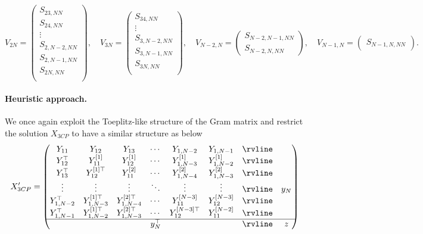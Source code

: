 \begin{appendices}
\begin{equation}
    \label{eq:ch3_QSD-V_2N}
    V_{2N} =
    \begin{pmatrix}
        S_{23,NN} \\
        S_{24,NN} \\
        \vdots \\
        S_{2,N-2,NN} \\
        S_{2,N-1,NN} \\
        S_{2N,NN} \\
    \end{pmatrix},
    \quad
    V_{3N} =
    \begin{pmatrix}
        S_{34,NN} \\
        \vdots \\
        S_{3,N-2,NN} \\
        S_{3,N-1,NN} \\
        S_{3N,NN} \\
    \end{pmatrix},
    \quad
    V_{N-2,N} =
    \begin{pmatrix}
        S_{N-2,N-1,NN} \\
        S_{N-2,N,NN}
    \end{pmatrix},
    \quad
    V_{N-1,N} =
    \begin{pmatrix}
        S_{N-1,N,NN}
    \end{pmatrix}.
\end{equation}

\paragraph{Heuristic approach.}

We once again exploit the Toeplitz-like structure of the Gram matrix and restrict the solution $X_{3CP}$ to have a similar structure as below
\begin{align}
    \label{eq:ch3_QSD-X_3CP}
    X'_{3CP} =
    \begin{pmatrix}
        Y_{11} & Y_{12} & Y_{13} & \cdots & Y_{1,N-2} & Y_{1,N-1} & \rvline & \\
        Y_{12}^\top & Y_{11}^{[1]} & Y_{12}^{[1]} & \cdots & Y_{1,N-3}^{[1]} & Y_{1,N-2}^{[1]} & \rvline & \\
        Y_{13}^\top & Y_{12}^{[1]\top} & Y_{11}^{[2]} & \cdots & Y_{1,N-4}^{[2]} & Y_{1,N-3}^{[2]} & \rvline \\
        \vdots & \vdots & \vdots & \ddots & \vdots & \vdots & \rvline & y_N \\
        Y_{1,N-2}^\top & Y_{1,N-3}^{[1]\top} & Y_{1,N-4}^{[2]\top} & \cdots & Y_{11}^{[N-3]} & Y_{12}^{[N-3]} & \rvline & \\
        Y_{1,N-1}^\top & Y_{1,N-2}^{[1]\top} & Y_{1,N-3}^{[2]\top} & \cdots & Y_{12}^{[N-3]\top} & Y_{11}^{[N-2]} & \rvline & \\
        \hline
         &  &  & y_N^\top &  &  & \rvline & z \\
    \end{pmatrix}
\end{align}


\end{appendices}
